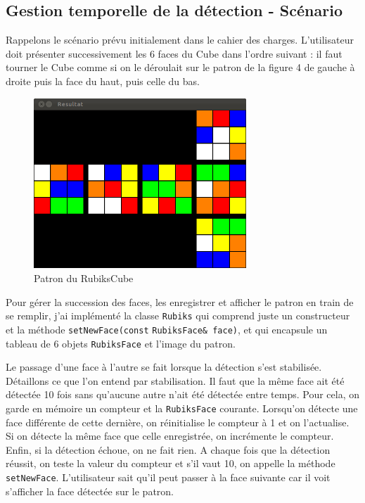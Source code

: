 \documentclass[a4paper,11pt]{article}
\begin{document}
\subsection{Gestion temporelle de la détection - Scénario}
Rappelons le scénario prévu initialement dans le cahier des charges. L'utilisateur doit présenter successivement
les 6 faces du Cube dans l'ordre suivant : il faut tourner le Cube comme si on le déroulait sur le patron de la
figure 4 de gauche à droite puis la face du haut, puis celle du bas.

\begin{figure}[h]
\begin{center}
 \includegraphics[width=8cm]{patron.png} 
\end{center}
 \caption{Patron du RubiksCube}
 \label{Patron du RubiksCube}
\end{figure}

Pour gérer la succession des faces, les enregistrer et afficher le patron en train de se remplir, j'ai implémenté
la classe \verb|Rubiks| qui comprend juste un constructeur et la méthode \verb|setNewFace(const| 
\verb|RubiksFace& face)|, 
et qui encapsule un tableau de 6 objets \verb|RubiksFace| et l'image du patron.

Le passage d'une face à l'autre se fait lorsque la détection s'est stabilisée. Détaillons ce que l'on entend
par stabilisation. Il faut que la même face ait été détectée 10 fois sans qu'aucune autre n'ait été détectée 
entre temps. Pour cela, on garde en mémoire un compteur et la \verb|RubiksFace| courante. Lorsqu'on détecte une
face différente de cette dernière, on réinitialise le compteur à 1 et on l'actualise. Si on détecte la même face
que celle enregistrée, on incrémente le compteur. Enfin, si la détection échoue, on ne fait rien. A chaque fois
que la détection réussit, on teste la valeur du compteur et s'il vaut 10, on appelle la méthode 
\verb|setNewFace|. L'utilisateur sait qu'il peut passer à la face suivante car il voit s'afficher la face
détectée sur le patron.
\end{document}
